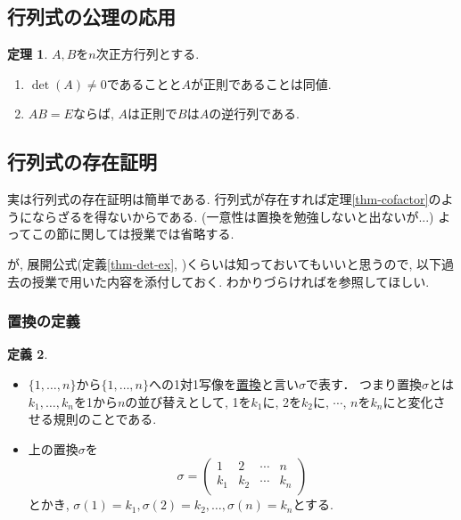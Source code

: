 \documentclass[dvipdfmx,a4paper,11pt]{article}
\theoremstyle{definition}
\newtheorem{thm}{定理}
\newtheorem{dfn}[thm]{定義}
\begin{document}
  
\subsection{行列式の公理の応用 \cite[3.4節]{M}}

 
 \begin{tcolorbox}[
    colback = white,
    colframe = green!35!black,
    fonttitle = \bfseries,
    breakable = true]
    \begin{thm}
    $A,B$を$n$次正方行列とする. 
        \begin{enumerate}
    \setlength{\parskip}{0cm} 
  \setlength{\itemsep}{0cm}   
\item $\det(A) \neq 0$であることと$A$が正則であることは同値.
\item $AB=E$ならば, $A$は正則で$B$は$A$の逆行列である. 
\end{enumerate}
  \end{thm}
 \end{tcolorbox}
 
\subsection{行列式の存在証明 \cite[3.5節]{M}}
実は行列式の存在証明は簡単である.
行列式が存在すれば定理\ref{thm-cofactor}のようにならざるを得ないからである. (一意性は置換を勉強しないと出ないが...)
よってこの節に関しては授業では省略する.

が, 展開公式(定義\ref{thm-det-ex}, \cite[命題3.3]{M})くらいは知っておいてもいいと思うので, 
以下過去の授業で用いた内容を添付しておく. 
わかりづらければ\cite{M}を参照してほしい. 

\subsubsection{置換の定義}

\begin{tcolorbox}[
    colback = white,
    colframe = green!35!black,
    fonttitle = \bfseries,
    breakable = true]
    \begin{dfn}
    \text{}
    \begin{itemize}
\item $\{ 1, \ldots, n\}$から$\{ 1, \ldots, n\}$への1対1写像を\underline{置換}と言い$\sigma$で表す．
つまり置換$\sigma$とは$k_1, \ldots, k_n$を1から$n$の並び替えとして, 
1を$k_1$に, 2を$k_2$に, $\cdots$, $n$を$k_n$にと変化させる規則のことである.
\item 上の置換$\sigma$を
$$
\sigma =
  \begin{pmatrix}
 1& 2  &\cdots &n\\
 k_1& k_2  &\cdots &k_n\\
 \end{pmatrix} 
$$
とかき, $\sigma(1) =k_1, \sigma(2) =k_2, \ldots, \sigma(n) =k_n$とする.
    \end{itemize}
  \end{dfn}
 \end{tcolorbox}
 
\end{document}
